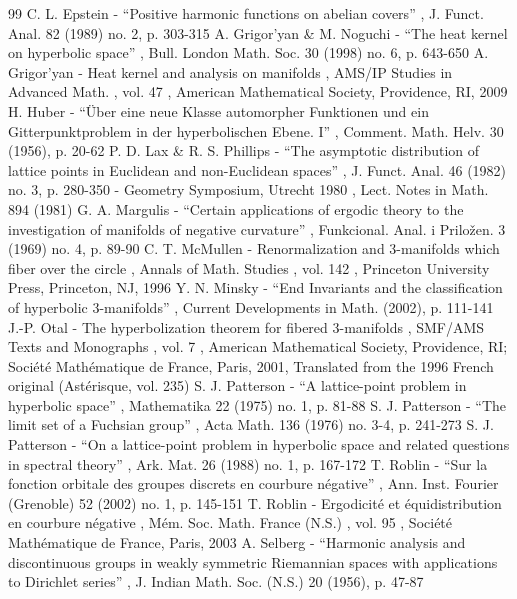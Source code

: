 \documentclass[10pt]{amsart}
\theoremstyle{plain}
\theoremstyle{definition}
\begin{document}
\begin{thebibliography}{99}
 C. L. Epstein - “Positive harmonic functions on abelian covers” , J. Funct. Anal. 82 (1989) no. 2, p. 303-315
 A. Grigor’yan \& M. Noguchi - “The heat kernel on hyperbolic space” , Bull. London Math. Soc. 30 (1998) no. 6, p. 643-650
 A. Grigor’yan - Heat kernel and analysis on manifolds , AMS/IP Studies in Advanced Math. , vol. 47 , American Mathematical Society, Providence, RI, 2009
 H. Huber - “Über eine neue Klasse automorpher Funktionen und ein Gitterpunktproblem in der hyperbolischen Ebene. I” , Comment. Math. Helv. 30 (1956), p. 20-62
 P. D. Lax \& R. S. Phillips - “The asymptotic distribution of lattice points in Euclidean and non-Euclidean spaces” , J. Funct. Anal. 46 (1982) no. 3, p. 280-350
 - Geometry Symposium, Utrecht 1980 , Lect. Notes in Math. 894 (1981)
 G. A. Margulis - “Certain applications of ergodic theory to the investigation of manifolds of negative curvature” , Funkcional. Anal. i Priložen. 3 (1969) no. 4, p. 89-90
 C. T. McMullen - Renormalization and 3-manifolds which fiber over the circle , Annals of Math. Studies , vol. 142 , Princeton University Press, Princeton, NJ, 1996
 Y. N. Minsky - “End Invariants and the classification of hyperbolic 3-manifolds” , Current Developments in Math. (2002), p. 111-141
 J.-P. Otal - The hyperbolization theorem for fibered 3-manifolds , SMF/AMS Texts and Monographs , vol. 7 , American Mathematical Society, Providence, RI; Société Mathématique de France, Paris, 2001, Translated from the 1996 French original (Astérisque, vol. 235)
 S. J. Patterson - “A lattice-point problem in hyperbolic space” , Mathematika 22 (1975) no. 1, p. 81-88
 S. J. Patterson - “The limit set of a Fuchsian group” , Acta Math. 136 (1976) no. 3-4, p. 241-273
 S. J. Patterson - “On a lattice-point problem in hyperbolic space and related questions in spectral theory” , Ark. Mat. 26 (1988) no. 1, p. 167-172
 T. Roblin - “Sur la fonction orbitale des groupes discrets en courbure négative” , Ann. Inst. Fourier (Grenoble) 52 (2002) no. 1, p. 145-151
 T. Roblin - Ergodicité et équidistribution en courbure négative , Mém. Soc. Math. France (N.S.) , vol. 95 , Société Mathématique de France, Paris, 2003
 A. Selberg - “Harmonic analysis and discontinuous groups in weakly symmetric Riemannian spaces with applications to Dirichlet series” , J. Indian Math. Soc. (N.S.) 20 (1956), p. 47-87

\end{thebibliography}
\end{document}
